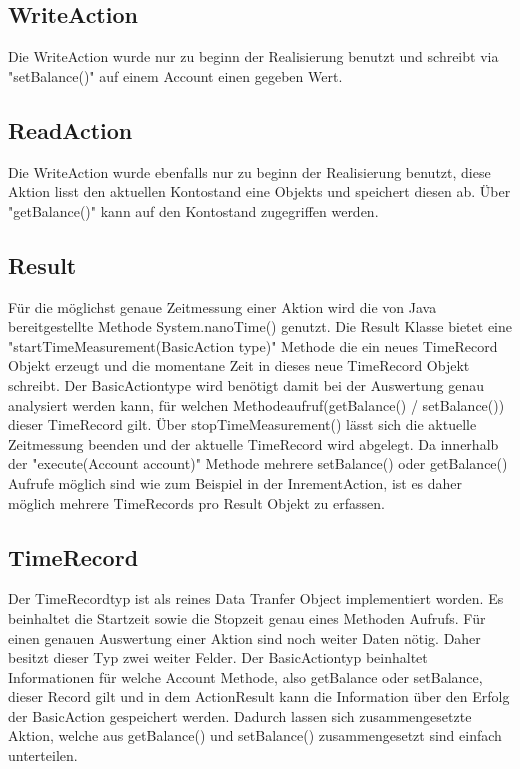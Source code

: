 \subsection{WriteAction}
\label{sec:writeAction}
Die WriteAction wurde nur zu beginn der Realisierung benutzt und schreibt via "setBalance()" auf einem Account einen gegeben Wert. 

\subsection{ReadAction}
\label{sec:readAction}
Die WriteAction wurde ebenfalls nur zu beginn der Realisierung benutzt, diese Aktion lisst den aktuellen Kontostand eine Objekts und speichert diesen ab. Über "getBalance()" kann auf den Kontostand zugegriffen werden.

\subsection{Result}
\label{sec:result}
Für die möglichst genaue Zeitmessung einer Aktion wird die von Java bereitgestellte Methode System.nanoTime() genutzt. Die Result Klasse bietet eine "startTimeMeasurement(BasicAction type)" Methode die ein neues TimeRecord Objekt erzeugt und die momentane Zeit in dieses neue TimeRecord Objekt schreibt. Der BasicActiontype wird benötigt damit bei der Auswertung genau analysiert werden kann, für welchen Methodeaufruf(getBalance() / setBalance()) dieser TimeRecord gilt. Über stopTimeMeasurement() lässt sich die aktuelle Zeitmessung beenden und der aktuelle TimeRecord wird abgelegt. Da innerhalb der "execute(Account account)" Methode mehrere setBalance() oder getBalance() Aufrufe möglich sind wie zum Beispiel in der InrementAction, ist es daher möglich  mehrere TimeRecords pro Result Objekt zu erfassen.

\subsection{TimeRecord}
\label{sec:timeRecord}
Der TimeRecordtyp ist als reines Data Tranfer Object implementiert worden. Es beinhaltet die Startzeit sowie die Stopzeit genau eines Methoden Aufrufs. Für einen genauen Auswertung einer Aktion sind noch weiter Daten nötig. Daher besitzt dieser Typ zwei weiter Felder. Der BasicActiontyp beinhaltet Informationen für welche Account Methode, also getBalance oder setBalance, dieser Record gilt und in dem ActionResult kann die Information über den Erfolg der BasicAction gespeichert werden. Dadurch lassen sich zusammengesetzte Aktion, welche aus getBalance() und setBalance() zusammengesetzt sind einfach unterteilen.

